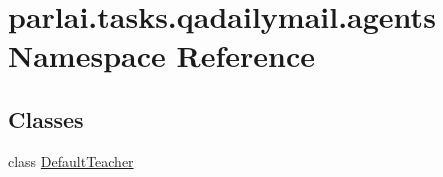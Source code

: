 \hypertarget{namespaceparlai_1_1tasks_1_1qadailymail_1_1agents}{}\section{parlai.\+tasks.\+qadailymail.\+agents Namespace Reference}
\label{namespaceparlai_1_1tasks_1_1qadailymail_1_1agents}
\subsection*{Classes}
\begin{DoxyCompactItemize}
\item 
class \hyperlink{classparlai_1_1tasks_1_1qadailymail_1_1agents_1_1DefaultTeacher}{Default\+Teacher}
\end{DoxyCompactItemize}

